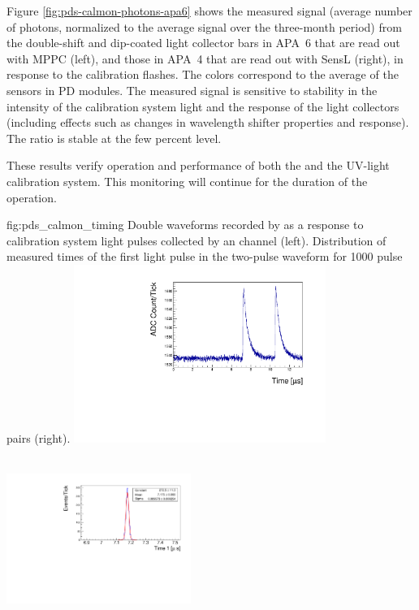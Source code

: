 Figure \ref{fig:pds-calmon-photons-apa6} shows the measured signal (average number of photons, normalized to the average signal over the three-month period) from the double-shift and dip-coated light collector bars in APA~6 that are read out with MPPC  (left), and those in APA~4 that are read out with SensL  (right), in response to the calibration flashes. The colors correspond to the average of the sensors in PD modules. The measured signal is sensitive to stability in the intensity of the calibration system light and the response of the light collectors (including effects such as changes in wavelength shifter properties and  response). The ratio is stable at the few percent level.

These results verify operation and performance of both the  and the UV-light calibration system. This monitoring will continue for the duration of the  operation.

\begin{dunefigure}
 {fig:pds_calmon_timing}
 {Double waveforms recorded by   as a response to calibration system light pulses collected by an  channel (left). Distribution of measured times of the first light pulse in the two-pulse waveform for 1000 pulse pairs (right).}
  \includegraphics[height=5.8cm,width=0.45\linewidth]{graphics/pds-double-waveform-arapuca-example.pdf}
 \includegraphics[height=6cm,width=0.45\textwidth]{graphics/pds-example-t1.pdf}  \end{dunefigure}

